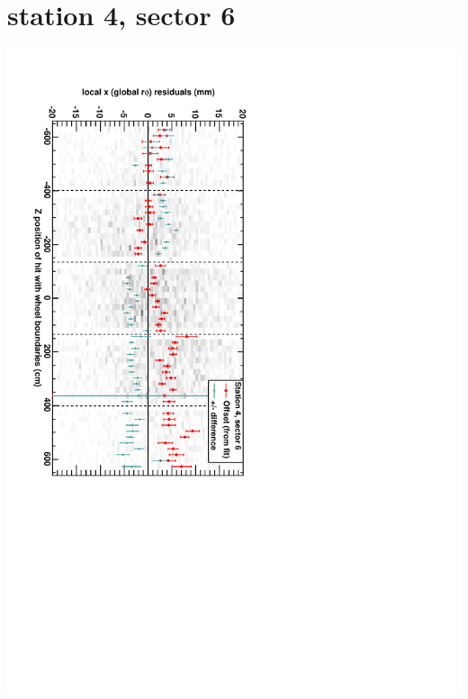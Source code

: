 \documentclass[compress]{beamer}
\begin{document}
\section*{station 4, sector 6}
\begin{frame} \vfill \mbox{\hspace{-1 cm}\includegraphics[height=1.2\linewidth, angle=90]{DTrphiVsZ_st4_sr06.pdf}} \end{frame}
\end{document}
